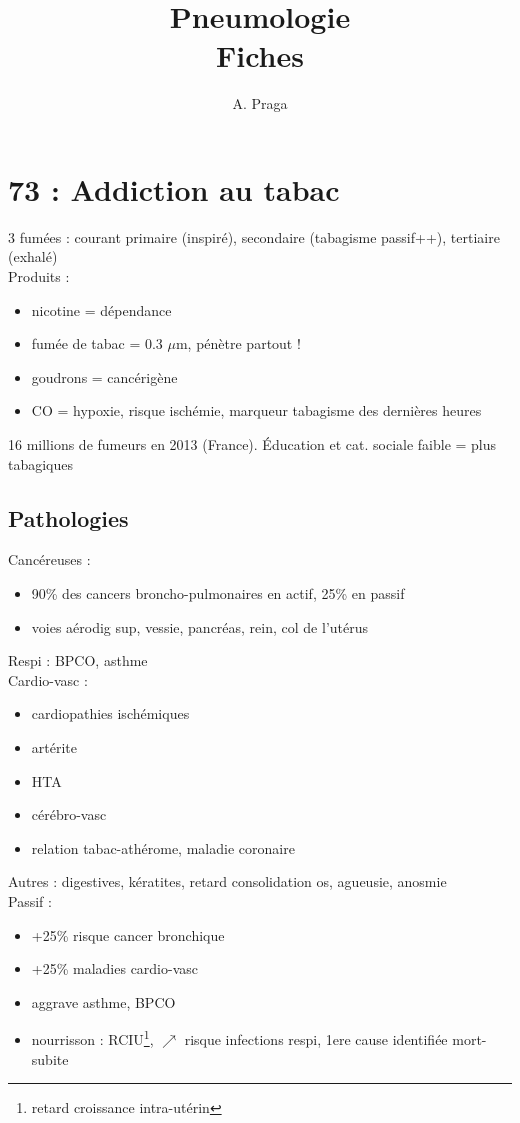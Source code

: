 
\usepackage{biocon}

\title{Pneumologie\\
\large Fiches}
\author{A. Praga}



\maketitle
\tableofcontents



\section{73 : Addiction au tabac}
3 fumées : courant primaire (inspiré), secondaire (tabagisme passif++), tertiaire (exhalé)\\
Produits :
\begin{itemize}
  \item nicotine = dépendance
  \item fumée de tabac = 0.3 $\mu$m, pénètre partout !
  \item goudrons = cancérigène
  \item CO = hypoxie, risque ischémie, marqueur tabagisme des dernières heures
\end{itemize}
16 millions de fumeurs en 2013 (France). Éducation et cat. sociale faible = plus
tabagiques
\subsection{Pathologies}
Cancéreuses :
\begin{itemize}
  \item 90\% des cancers broncho-pulmonaires en actif, 25\% en passif
  \item voies aérodig sup, vessie, pancréas, rein, col de l'utérus
\end{itemize}
Respi : BPCO, asthme\\
Cardio-vasc : 
\begin{itemize}
  \item cardiopathies ischémiques
  \item artérite
  \item HTA
  \item cérébro-vasc
  \item relation tabac-athérome, maladie coronaire
\end{itemize}
Autres : digestives, kératites, retard consolidation os, agueusie, anosmie\\
Passif :
\begin{itemize}
  \item +25\% risque cancer bronchique
  \item +25\% maladies cardio-vasc
  \item aggrave asthme, BPCO
  \item nourrisson : RCIU\footnote{retard croissance intra-utérin}, \(\nearrow\) risque
    infections respi, 1ere cause identifiée mort-subite
\end{itemize}
